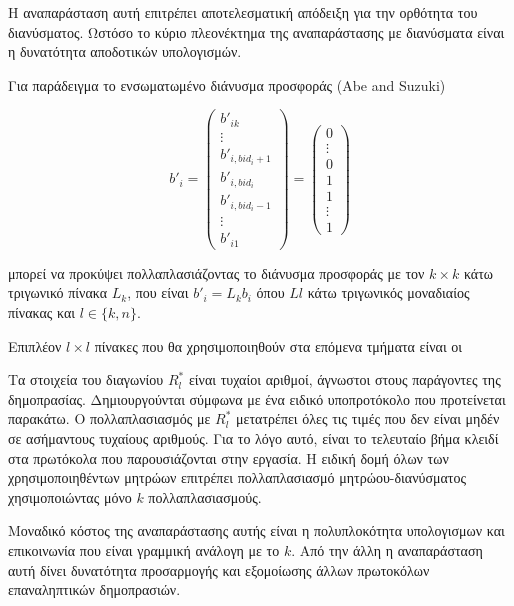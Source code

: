 \documentclass[letterpaper,11pt]{article}
\begin{document}
Η αναπαράσταση αυτή επιτρέπει αποτελεσματική απόδειξη για την ορθότητα του διανύσματος. Ωστόσο το κύριο πλεονέκτημα της αναπαράστασης με
διανύσματα είναι η δυνατότητα αποδοτικών υπολογισμών.

Για παράδειγμα το ενσωματωμένο διάνυσμα προσφοράς (Abe and Suzuki)

\begin{displaymath}
	b'_i = 
	\left ( \begin{array}{c}
		b'_{ik}	\\
		\vdots	\\
		b'_{i,bid_i+1} \\
		b'_{i,bid_i}	\\
		b'_{i,bid_i-1} \\
		\vdots \\
		b'_{i1}
	\end{array} \right)
	=
	\left ( \begin{array}{c}
	0	\\
	\vdots \\
	0 \\
	1 \\
	1 \\
	\vdots \\
	1
	\end{array} \right)
\end{displaymath}

μπορεί να προκύψει πολλαπλασιάζοντας το διάνυσμα προσφοράς με τον $k×k$ κάτω τριγωνικό πίνακα $L_k$, που είναι $b'_i=L_kb_i$ 
όπου $Ll$ κάτω τριγωνικός μοναδιαίος πίνακας και $l \in \{k,n\}$.

Επιπλέον $l×l$ πίνακες που θα χρησιμοποιηθούν στα επόμενα τμήματα είναι οι


Tα στοιχεία του διαγωνίου $R^*_l$ είναι τυχαίοι αριθμοί, άγνωστοι στους παράγοντες της δημοπρασίας. Δημιουργούνται σύμφωνα με ένα ειδικό
υποπροτόκολο που προτείνεται παρακάτω. Ο πολλαπλασιασμός με $R^*_l$ μετατρέπει όλες τις τιμές που δεν είναι μηδέν σε ασήμαντους τυχαίους αριθμούς.
Για το λόγο αυτό, είναι το τελευταίο βήμα κλειδί στα πρωτόκολα που παρουσιάζονται στην εργασία. Η ειδική δομή όλων των χρησιμοποιηθέντων μητρώων
επιτρέπει πολλαπλασιασμό μητρώου-διανύσματος χησιμοποιώντας μόνο $k$ πολλαπλασιασμούς.

Μοναδικό κόστος της αναπαράστασης αυτής είναι η πολυπλοκότητα υπολογισμων και επικοινωνία που είναι γραμμική ανάλογη με το $k$. Από την άλλη η
αναπαράσταση αυτή δίνει δυνατότητα προσαρμογής και εξομοίωσης άλλων πρωτοκόλων επαναληπτικών δημοπρασιών.
\end{document}
